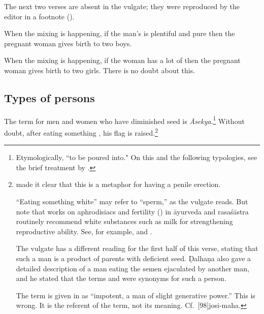 \begin{translation}
{The next two verses are absent in the vulgate; they were reproduced by the 
editor in a footnote (\cite[348b, n.\,3]{vulgate}).}

\item [3.2.37.1]
\begin{sloka}
    When the mixing is happening, if the man's  is plentiful 
    and pure then the pregnant woman gives birth to two boys.
\end{sloka}

\item [3.2.37.2]
\begin{sloka}
    When the mixing is happening, if the woman has a lot of 
     then the pregnant woman gives birth to two girls.
    There is no doubt about this. 
\end{sloka}

\subsection{Types of persons}

\item[3.2.38]

The term for men and women who have diminished seed is
\emph{Āsekya}.\footnote{Etymologically, “to be poured into."  On this and the
    following typologies, see the brief treatment by
    \citet[216--217]{meul-1997}.}  Without doubt, after eating something
    , his flag is raised.\footnote{
        made it clear that this is a metaphor for having a penile
        erection.\label{erection}

“Eating something white” may refer to  “sperm,” as the
vulgate reads.  But note that works on aphrodisiacs and fertility
() in āyurveda and rasaśāstra routinely recommend
white substances such as milk for strengthening reproductive ability.
See, for example,  and .

The vulgate has a different reading for the first half of this verse, stating that 
such a man is a product of parents with deficient seed.  Ḍalhaṇa also gave a 
detailed description of a man eating the semen ejaculated by another man, 
and he stated that the terms  and  were 
synonyms for such a person.

The term  is given in \cite[161]{moni-sans} as “impotent,
a man of slight generative power.”  This is wrong.  It is the
referent of the term, not its meaning. Cf.\ [98]{josi-maha}.

}
\end{translation}
